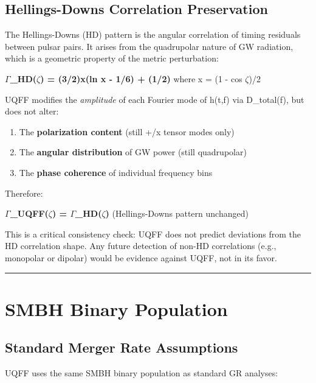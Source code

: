 \documentclass[12pt,a4paper]{article}
\begin{document}
\subsection{Hellings-Downs Correlation Preservation}

The Hellings-Downs (HD) pattern is the angular correlation of timing residuals between pulsar pairs. It arises from the quadrupolar nature of GW radiation, which is a geometric property of the metric perturbation:

\textbf{$\Gamma$\_HD($\zeta$) = (3/2)x(ln x - 1/6) + (1/2)} where x = (1 - cos $\zeta$)/2

UQFF modifies the \emph{amplitude} of each Fourier mode of h(t,f) via D\_total(f), but does not alter:

\begin{enumerate}
  \item The \textbf{polarization content} (still +/x tensor modes only)
  \item The \textbf{angular distribution} of GW power (still quadrupolar)
  \item The \textbf{phase coherence} of individual frequency bins
\end{enumerate}

Therefore:

\textbf{$\Gamma$\_UQFF($\zeta$) = $\Gamma$\_HD($\zeta$)} (Hellings-Downs pattern unchanged)

This is a critical consistency check: UQFF does not predict deviations from the HD correlation shape. Any future detection of non-HD correlations (e.g., monopolar or dipolar) would be evidence against UQFF, not in its favor.

\medskip\hrule\medskip

\section{SMBH Binary Population}

\subsection{Standard Merger Rate Assumptions}

UQFF uses the same SMBH binary population as standard GR analyses:
\end{document}
